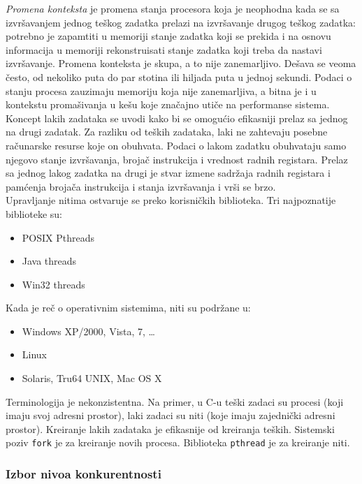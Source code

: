 \documentclass[../main.tex]{subfiles}
\begin{document}
{\it Promena konteksta} je promena stanja procesora koja je neophodna kada se sa izvršavanjem jednog teškog zadatka prelazi na izvršavanje drugog teškog zadatka: potrebno je zapamtiti u memoriji stanje zadatka koji se prekida i na osnovu informacija u memoriji rekonstruisati stanje zadatka koji treba da nastavi izvršavanje. Promena konteksta je skupa, a to nije zanemarljivo. Dešava se veoma često, od nekoliko puta do par stotina ili hiljada puta u jednoj sekundi. Podaci o stanju procesa zauzimaju memoriju koja nije zanemarljiva, a bitna je i u kontekstu promašivanja u kešu koje značajno utiče na performanse sistema.
\\
\indent Koncept lakih zadataka se uvodi kako bi se omogućio efikasniji prelaz sa jednog na drugi zadatak. Za razliku od teških zadataka, laki ne zahtevaju posebne računarske resurse koje on obuhvata. Podaci o lakom zadatku obuhvataju samo njegovo stanje izvršavanja, brojač instrukcija i vrednost radnih registara. Prelaz sa jednog lakog zadatka na drugi je stvar izmene sadržaja radnih registara i pamćenja brojača instrukcija i stanja izvršavanja i vrši se brzo.
\\
Upravljanje nitima ostvaruje se preko korisničkih biblioteka. Tri najpoznatije biblioteke su:
\begin{itemize}
\item POSIX Pthreads
\item Java threads
\item Win32 threads
\end{itemize}
Kada je reč o operativnim sistemima, niti su podržane u:
\begin{itemize}
\item Windows XP/2000, Vista, 7, \ldots
\item Linux
\item Solaris, Tru64 UNIX, Mac OS X
\end{itemize}

Terminologija je nekonzistentna. Na primer, u C-u teški zadaci su procesi (koji imaju svoj adresni prostor), laki zadaci su niti (koje imaju zajednički adresni prostor). Kreiranje lakih zadataka je efikasnije od kreiranja teških. Sistemski poziv \texttt{fork} je za kreiranje novih procesa. Biblioteka \texttt{pthread} je za kreiranje niti.

\subsubsection{Izbor nivoa konkurentnosti}						%
\end{document}
